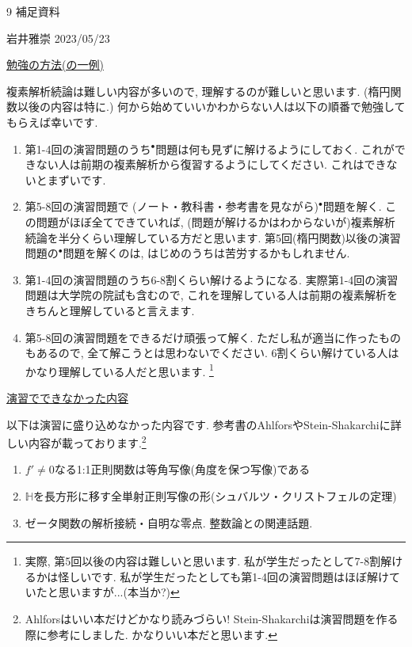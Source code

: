 \documentclass[dvipdfmx,a4paper,11pt]{article}
\theoremstyle{definition}
\begin{document}

\begin{center}
{\Large 9 補足資料}
\end{center}

\begin{flushright}
 岩井雅崇 2023/05/23
\end{flushright}

\vspace{12pt}
\hspace{-24pt}\underline{勉強の方法(の一例)}

複素解析続論は難しい内容が多いので, 理解するのが難しいと思います. (楕円関数以後の内容は特に.)
何から始めていいかわからない人は以下の順番で勉強してもらえば幸いです. 

       \begin{enumerate}
\setlength{\parskip}{0cm} 
  \setlength{\itemsep}{0cm} 
    \item 第1-4回の演習問題のうち$^{\bullet}$問題は何も見ずに解けるようにしておく.  これができない人は前期の複素解析から復習するようにしてください. これはできないとまずいです.
  \item 第5-8回の演習問題で (ノート・教科書・参考書を見ながら)$^{\bullet}$問題を解く. この問題がほぼ全てできていれば, (問題が解けるかはわからないが)複素解析続論を半分くらい理解している方だと思います. 第5回(楕円関数)以後の演習問題の$^{\bullet}$問題を解くのは, はじめのうちは苦労するかもしれません.
      \item 第1-4回の演習問題のうち6-8割くらい解けるようになる. 実際第1-4回の演習問題は大学院の院試も含むので, これを理解している人は前期の複素解析をきちんと理解していると言えます.
      \item  第5-8回の演習問題をできるだけ頑張って解く. ただし私が適当に作ったものもあるので, 全て解こうとは思わないでください.  6割くらい解けている人はかなり理解している人だと思います. \footnote{実際, 第5回以後の内容は難しいと思います. 私が学生だったとして7-8割解けるかは怪しいです. 私が学生だったとしても第1-4回の演習問題はほぼ解けていたと思いますが...(本当か?)}
  \end{enumerate}
  
  \vspace{12pt}
\hspace{-24pt}\underline{演習でできなかった内容}

以下は演習に盛り込めなかった内容です. 参考書のAhlforsやStein-Shakarchiに詳しい内容が載っております.\footnote{Ahlforsはいい本だけどかなり読みづらい! Stein-Shakarchiは演習問題を作る際に参考にしました. かなりいい本だと思います.} 
\begin{enumerate}
\setlength{\parskip}{0cm} 
  \setlength{\itemsep}{0cm} 
  \item $f' \neq 0$なる1:1正則関数は等角写像(角度を保つ写像)である
  \item $\mathbb{H}$を長方形に移す全単射正則写像の形(シュバルツ・クリストフェルの定理)
  \item ゼータ関数の解析接続・自明な零点. 整数論との関連話題.
  \end{enumerate}
\end{document}
